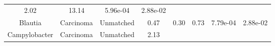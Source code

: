 \documentclass[12pt,]{article}
\begin{document}
\begin{longtable}[]{@{}cccccccc@{}}
\begin{minipage}[t]{0.14\columnwidth}
2.02\strut
\end{minipage} & \begin{minipage}[t]{0.14\columnwidth}\centering\strut
13.14\strut
\end{minipage} & \begin{minipage}[t]{0.06\columnwidth}\centering\strut
5.96e-04\strut
\end{minipage} & \begin{minipage}[t]{0.06\columnwidth}\centering\strut
2.88e-02\strut
\end{minipage}\tabularnewline
\begin{minipage}[t]{0.18\columnwidth}\centering\strut
Blautia\strut
\end{minipage} & \begin{minipage}[t]{0.07\columnwidth}\centering\strut
Carcinoma\strut
\end{minipage} & \begin{minipage}[t]{0.09\columnwidth}\centering\strut
Unmatched\strut
\end{minipage} & \begin{minipage}[t]{0.03\columnwidth}\centering\strut
0.47\strut
\end{minipage} & \begin{minipage}[t]{0.14\columnwidth}\centering\strut
0.30\strut
\end{minipage} & \begin{minipage}[t]{0.14\columnwidth}\centering\strut
0.73\strut
\end{minipage} & \begin{minipage}[t]{0.06\columnwidth}\centering\strut
7.79e-04\strut
\end{minipage} & \begin{minipage}[t]{0.06\columnwidth}\centering\strut
2.88e-02\strut
\end{minipage}\tabularnewline
\begin{minipage}[t]{0.18\columnwidth}\centering\strut
Campylobacter\strut
\end{minipage} & \begin{minipage}[t]{0.07\columnwidth}\centering\strut
Carcinoma\strut
\end{minipage} & \begin{minipage}[t]{0.09\columnwidth}\centering\strut
Unmatched\strut
\end{minipage} & \begin{minipage}[t]{0.03\columnwidth}\centering\strut
2.13\strut
\end{minipage} & \begin{minipage}[t]{0.14\columnwidth}\centering\strut

\end{minipage}
\end{longtable}
\end{document}

